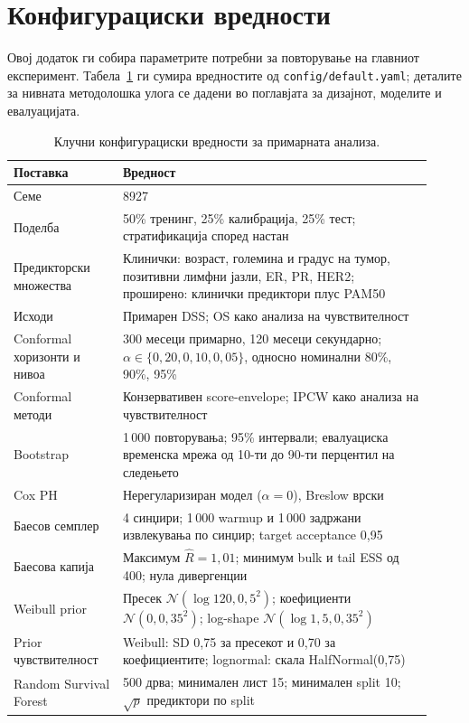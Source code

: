 \documentclass[12pt]{article}
\begin{document}
\section{Конфигурациски вредности}

Овој додаток ги собира параметрите потребни за повторување на главниот
експеримент. Табела~\ref{tab:appendix-config} ги сумира вредностите од
\texttt{config/default.yaml}; деталите за нивната методолошка улога се дадени
во поглавјата за дизајнот, моделите и евалуацијата.

\begin{table}[ht]
\centering
\caption{Клучни конфигурациски вредности за примарната анализа.}
\label{tab:appendix-config}
\small
\begin{tabular}{p{0.24\linewidth}p{0.68\linewidth}}
\hline
Поставка & Вредност \\
\hline
Семе & 8927 \\
Поделба & 50\% тренинг, 25\% калибрација, 25\% тест; стратификација според настан \\
Предикторски множества & Клинички: возраст, големина и градус на тумор, позитивни лимфни јазли, ER, PR, HER2; проширено: клинички предиктори плус PAM50 \\
Исходи & Примарен DSS; OS како анализа на чувствителност \\
Conformal хоризонти и нивоа & 300 месеци примарно, 120 месеци секундарно; $\alpha\in\{0{,}20,0{,}10,0{,}05\}$, односно номинални 80\%, 90\%, 95\% \\
Conformal методи & Конзервативен score-envelope; IPCW како анализа на чувствителност \\
Bootstrap & 1\,000 повторувања; 95\% интервали; евалуациска временска мрежа од 10-ти до 90-ти перцентил на следењето \\
Cox PH & Нерегуларизиран модел ($\alpha=0$), Breslow врски \\
Баесов семплер & 4 синџири; 1\,000 warmup и 1\,000 задржани извлекувања по синџир; target acceptance 0,95 \\
Баесова капија & Максимум $\widehat{R}=1{,}01$; минимум bulk и tail ESS од 400; нула дивергенции \\
Weibull prior & Пресек $\mathcal{N}(\log 120,0{,}5^2)$; коефициенти $\mathcal{N}(0,0{,}35^2)$; log-shape $\mathcal{N}(\log 1{,}5,0{,}35^2)$ \\
Prior чувствителност & Weibull: SD 0,75 за пресекот и 0,70 за коефициентите; lognormal: скала HalfNormal(0,75) \\
Random Survival Forest & 500 дрва; минимален лист 15; минимален split 10; $\sqrt{p}$ предиктори по split \\
\hline
\end{tabular}
\end{table}
\end{document}

